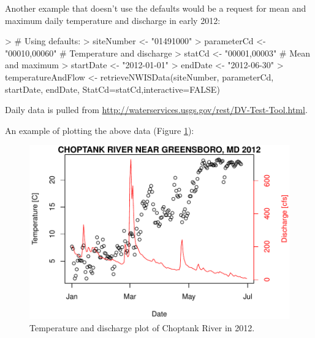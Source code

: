 \documentclass[a4paper,11pt]{article}
\begin{document}
Another example that doesn't use the defaults would be a request for mean and maximum daily temperature and discharge in early 2012:
\begin{Schunk}
\begin{Sinput}
> # Using defaults:
> siteNumber <- "01491000" 
> parameterCd <- "00010,00060"  # Temperature and discharge
> statCd <- "00001,00003"  # Mean and maximum
> startDate <- "2012-01-01"
> endDate <- "2012-06-30"
> temperatureAndFlow <- retrieveNWISData(siteNumber, parameterCd, 
                   startDate, endDate, StatCd=statCd,interactive=FALSE)
\end{Sinput}
\end{Schunk}

Daily data is pulled from \url{http://waterservices.usgs.gov/rest/DV-Test-Tool.html}. 

An example of plotting the above data (Figure \ref{fig:TD}):

\begin{Schunk}
\end{Schunk}
\newpage

\begin{figure}
\begin{center}
\includegraphics{dataRetrieval-fig1}
\end{center}
\caption{Temperature and discharge plot of Choptank River in 2012.}
\label{fig:TD}
\end{figure}
\end{document}
